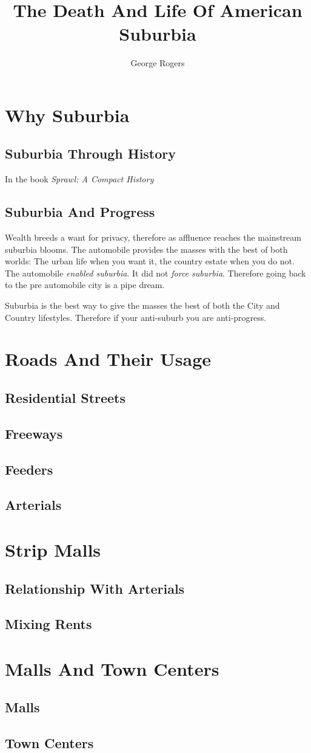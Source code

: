 \documentclass[8pt]{amsbook}
\title{The Death And Life Of American Suburbia}
\author{George Rogers}
\begin{document}
\dominitoc
\maketitle

\tableofcontents

\chapter{Why Suburbia}
\minitoc

\section{Suburbia Through History}
In the book \textsl{Sprawl: A Compact History}\cite{Bruegmann05}

\section{Suburbia And Progress}

Wealth breeds a want for privacy,
therefore as affluence reaches the mainstream suburbia blooms.
The automobile provides the masses with the best of both worlds:
The urban life when you want it, the country estate when you do not.
The automobile \emph{enabled suburbia}. It did not \emph{force suburbia}.
Therefore going back to the pre automobile city is a pipe dream.

Suburbia is the best way to give the masses the best of both the City and Country lifestyles.
Therefore if your anti-suburb you are anti-progress.
\chapter{Roads And Their Usage}
\minitoc
\section{Residential Streets}
\section{Freeways}
\section{Feeders}
\section{Arterials}
\chapter{Strip Malls}
\minitoc
\section{Relationship With Arterials}
\section{Mixing Rents}
\chapter{Malls And Town Centers}
\minitoc
\section{Malls}
\section{Town Centers}


\end{document}
